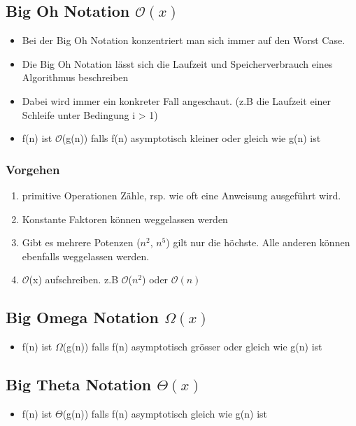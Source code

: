 \subsection{Big Oh Notation $\mathcal{O}(x)$}
\begin{itemize}
	\item Bei der Big Oh Notation konzentriert man sich immer auf den Worst Case. 
	\item Die Big Oh Notation lässt sich die Laufzeit und Speicherverbrauch eines Algorithmus beschreiben
	\item Dabei wird immer ein konkreter Fall angeschaut. (z.B die Laufzeit einer Schleife unter Bedingung i > 1) 
	\item f(n) ist $\mathcal{O}$(g(n)) falls f(n) asymptotisch kleiner oder gleich wie g(n) ist
\end{itemize}

\subsubsection{Vorgehen}
\begin{enumerate}
	\item primitive Operationen Zähle, rsp. wie oft eine Anweisung ausgeführt wird.
	\item Konstante Faktoren können weggelassen werden
	\item Gibt es mehrere Potenzen ($n^2$, $n^5$) gilt nur die höchste. Alle anderen können ebenfalls weggelassen werden.
	\item $\mathcal{O}$(x) aufschreiben. z.B $\mathcal{O}$($n^2$) oder $\mathcal{O}(n)$
\end{enumerate}

\subsection{Big Omega Notation $\Omega(x)$}
\begin{itemize}
	\item f(n) ist $\Omega$(g(n)) falls f(n) asymptotisch grösser oder gleich wie g(n) ist
\end{itemize}

\subsection{Big Theta Notation $\Theta(x)$}
\begin{itemize}
	\item f(n) ist $\Theta$(g(n)) falls f(n) asymptotisch gleich wie g(n) ist
\end{itemize}


